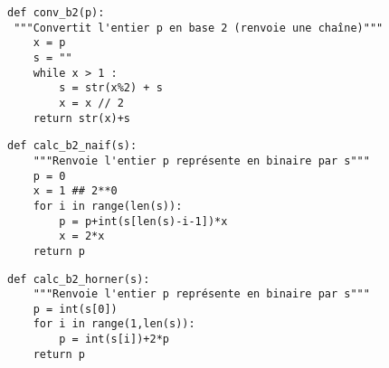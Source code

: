 \exer{}
\setcounter{numques}{0}


\begin{lstlisting}
def conv_b2(p):
 """Convertit l'entier p en base 2 (renvoie une chaîne)"""
    x = p
    s = ""
    while x > 1 :
        s = str(x%2) + s
        x = x // 2
    return str(x)+s
\end{lstlisting}    


\begin{lstlisting}
def calc_b2_naif(s):
    """Renvoie l'entier p représente en binaire par s"""
    p = 0
    x = 1 ## 2**0
    for i in range(len(s)):
        p = p+int(s[len(s)-i-1])*x
        x = 2*x
    return p
\end{lstlisting}


\begin{lstlisting}
def calc_b2_horner(s):
    """Renvoie l'entier p représente en binaire par s"""
    p = int(s[0])
    for i in range(1,len(s)):
        p = int(s[i])+2*p
    return p
\end{lstlisting}